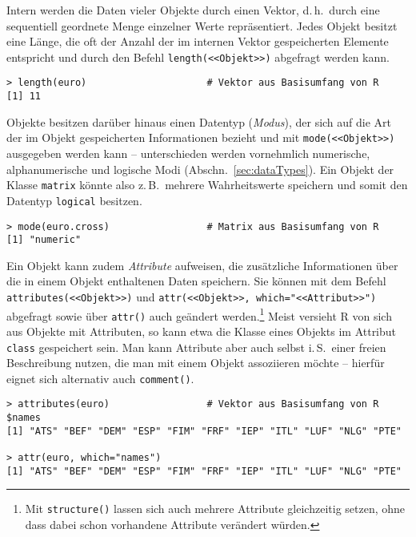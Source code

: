 Intern werden die Daten vieler Objekte durch einen Vektor, d.\,h.\ durch eine sequentiell geordnete Menge einzelner Werte repräsentiert. Jedes Objekt besitzt eine Länge, die oft der Anzahl der im internen Vektor gespeicherten Elemente entspricht und durch den Befehl \lstinline!length(<<Objekt>>)! abgefragt werden kann.
\begin{lstlisting}
> length(euro)                     # Vektor aus Basisumfang von R
[1] 11
\end{lstlisting}

Objekte besitzen darüber hinaus einen Datentyp (\emph{Modus}), der sich auf die Art der im Objekt gespeicherten Informationen bezieht und mit \lstinline!mode(<<Objekt>>)! ausgegeben werden kann -- unterschieden werden vornehmlich numerische, alphanumerische und logische Modi (Abschn.\ \ref{sec:dataTypes}). Ein Objekt der Klasse \lstinline!matrix! könnte also z.\,B.\ mehrere Wahrheitswerte speichern und somit den Datentyp \lstinline!logical! besitzen.
\begin{lstlisting}
> mode(euro.cross)                 # Matrix aus Basisumfang von R
[1] "numeric"
\end{lstlisting}

Ein Objekt kann zudem \emph{Attribute} aufweisen, die zusätzliche Informationen über die in einem Objekt enthaltenen Daten speichern. Sie können mit dem Befehl \lstinline!attributes(<<Objekt>>)! und \lstinline!attr(<<Objekt>>, which="<<Attribut>>")! abgefragt sowie über \lstinline!attr()! auch geändert werden.\footnote{Mit  \lstinline!structure()! lassen sich auch mehrere Attribute gleichzeitig setzen, ohne dass dabei schon vorhandene Attribute verändert würden.} Meist versieht R von sich aus Objekte mit Attributen, so kann etwa die Klasse eines Objekts im Attribut \lstinline!class! gespeichert sein. Man kann Attribute aber auch selbst i.\,S.\ einer freien Beschreibung nutzen, die man mit einem Objekt assoziieren möchte -- hierfür eignet sich alternativ auch \lstinline!comment()!.
\begin{lstlisting}
> attributes(euro)                 # Vektor aus Basisumfang von R
$names
[1] "ATS" "BEF" "DEM" "ESP" "FIM" "FRF" "IEP" "ITL" "LUF" "NLG" "PTE"

> attr(euro, which="names")
[1] "ATS" "BEF" "DEM" "ESP" "FIM" "FRF" "IEP" "ITL" "LUF" "NLG" "PTE"
\end{lstlisting}

